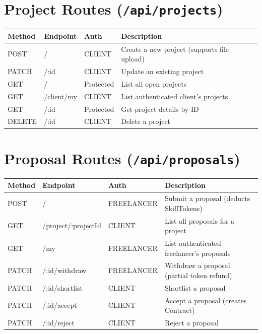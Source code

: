 \section{Project Routes (\texttt{/api/projects})}

\begin{longtable}{|p{2.5cm}|p{4cm}|p{2cm}|p{5cm}|}
\hline
\textbf{Method} & \textbf{Endpoint} & \textbf{Auth} & \textbf{Description} \\ \hline
\endhead
POST & / & CLIENT & Create a new project (supports file upload) \\ \hline
PATCH & /:id & CLIENT & Update an existing project \\ \hline
GET & / & Protected & List all open projects \\ \hline
GET & /client/my & CLIENT & List authenticated client's projects \\ \hline
GET & /:id & Protected & Get project details by ID \\ \hline
DELETE & /:id & CLIENT & Delete a project \\ \hline
\end{longtable}

\section{Proposal Routes (\texttt{/api/proposals})}

\begin{longtable}{|p{2.5cm}|p{4.5cm}|p{2cm}|p{5cm}|}
\hline
\textbf{Method} & \textbf{Endpoint} & \textbf{Auth} & \textbf{Description} \\ \hline
\endhead
POST & / & FREELANCER & Submit a proposal (deducts SkillTokens) \\ \hline
GET & /project/:projectId & CLIENT & List all proposals for a project \\ \hline
GET & /my & FREELANCER & List authenticated freelancer's proposals \\ \hline
PATCH & /:id/withdraw & FREELANCER & Withdraw a proposal (partial token refund) \\ \hline
PATCH & /:id/shortlist & CLIENT & Shortlist a proposal \\ \hline
PATCH & /:id/accept & CLIENT & Accept a proposal (creates Contract) \\ \hline
PATCH & /:id/reject & CLIENT & Reject a proposal \\ \hline
\end{longtable}

